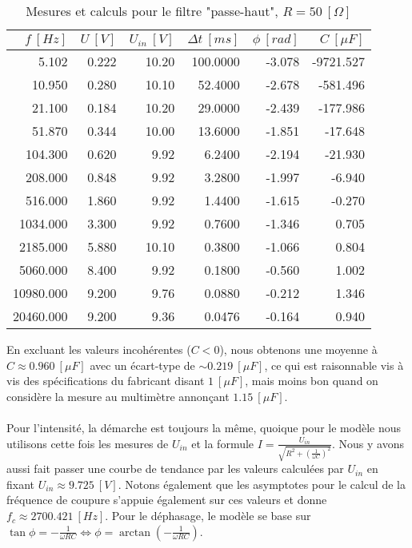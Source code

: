 \begin{table}[H]
\centering
\begin{tabular}{rrrrrr}
\toprule
 $f \ [Hz]$ &  $U \ [V]$ & $U_{in} \ [V]$ &  $\Delta t \ [ms]$ &  $\phi \ [rad]$ &  $C \ [\mu F]$ \\
\midrule
     5.102 &        0.222 &           10.20 &    100.0000 & -3.078 &      -9721.527 \\
    10.950 &        0.280 &           10.10 &     52.4000 & -2.678 &       -581.496 \\
    21.100 &        0.184 &           10.20 &     29.0000 & -2.439 &       -177.986 \\
    51.870 &        0.344 &           10.00 &     13.6000 & -1.851 &        -17.648 \\
   104.300 &        0.620 &            9.92 &      6.2400 & -2.194 &        -21.930 \\
   208.000 &        0.848 &            9.92 &      3.2800 & -1.997 &         -6.940 \\
   516.000 &        1.860 &            9.92 &      1.4400 & -1.615 &         -0.270 \\
  1034.000 &        3.300 &            9.92 &      0.7600 & -1.346 &          0.705 \\
  2185.000 &        5.880 &           10.10 &      0.3800 & -1.066 &          0.804 \\
  5060.000 &        8.400 &            9.92 &      0.1800 & -0.560 &          1.002 \\
 10980.000 &        9.200 &            9.76 &      0.0880 & -0.212 &          1.346 \\
 20460.000 &        9.200 &            9.36 &      0.0476 & -0.164 &          0.940 \\
\bottomrule
\end{tabular}
\caption{Mesures et calculs pour le filtre "passe-haut", $R = 50 \ [ \Omega ]$}
\label{tab:p-h-50}
\end{table}

En excluant les valeurs incohérentes ($C<0$), nous obtenons une moyenne à $C \approx 0.960 \ [\mu F]$ avec un écart-type de $\sim 0.219 \ [\mu F]$, ce qui est raisonnable vis à vis des spécifications du fabricant disant $1 \ [\mu F]$, mais moins bon quand on considère la mesure au multimètre annonçant $1.15 \ [\mu F]$.\\ \\
Pour l'intensité, la démarche est toujours la même, quoique pour le modèle nous utilisons cette fois les mesures de $U_{in}$ et la formule $I = \frac{U_{in}}{\sqrt{R^2 + \left(\frac{1}{\omega C}\right)^2}}$. Nous y avons aussi fait passer une courbe de tendance par les valeurs calculées par $U_{in}$ en fixant $U_{in} \approx 9.725 \ [V]$. Notons également que les asymptotes pour le calcul de la fréquence de coupure s'appuie également sur ces valeurs et donne $f_c \approx 2700.421 \ [Hz]$. Pour le déphasage, le modèle se base sur $\tan \phi = - \frac{1}{\omega R C} \Leftrightarrow \phi = \arctan \left( -\frac{1}{\omega R C} \right)$.

